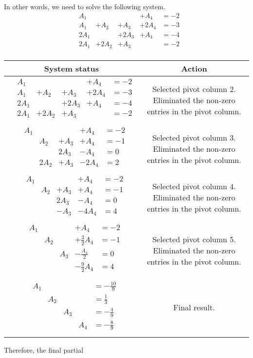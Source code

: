 {\[\]
In other words, we need to solve the following system. \[\begin{array}{llllll} & A_{1} & & & +A_{4} & =-2\\ & A_{1} & +A_{2} & +A_{3} & +2A_{4} & =-3\\ & 2A_{1} & & +2A_{3} & +A_{4} & =-4\\ & 2A_{1} & +2A_{2} & +A_{3} & & =-2\\\end{array}\] \begin{longtable}{cc} System status&Action \\\hline $\begin{array}{llllll} & A_{1} & & & +A_{4} & =-2\\ & A_{1} & +A_{2} & +A_{3} & +2A_{4} & =-3\\ & 2A_{1} & & +2A_{3} & +A_{4} & =-4\\ & 2A_{1} & +2A_{2} & +A_{3} & & =-2\\\end{array}$& Selected pivot column 2. Eliminated the non-zero entries in the pivot column. \\\hline $\begin{array}{llllll} & A_{1} & & & +A_{4} & =-2\\ & & A_{2} & +A_{3} & +A_{4} & =-1\\ & & & 2A_{3} & -A_{4} & =0\\ & & 2A_{2} & +A_{3} & -2A_{4} & =2\\\end{array}$& Selected pivot column 3. Eliminated the non-zero entries in the pivot column. \\\hline $\begin{array}{llllll} & A_{1} & & & +A_{4} & =-2\\ & & A_{2} & +A_{3} & +A_{4} & =-1\\ & & & 2A_{3} & -A_{4} & =0\\ & & & -A_{3} & -4A_{4} & =4\\\end{array}$& Selected pivot column 4. Eliminated the non-zero entries in the pivot column. \\\hline $\begin{array}{llllll} & A_{1} & & & +A_{4} & =-2\\ & & A_{2} & & +\frac{3}{2}A_{4} & =-1\\ & & & A_{3} & -\frac{A_{4} }{2} & =0\\ & & & & -\frac{9}{2}A_{4} & =4\\\end{array}$& Selected pivot column 5. Eliminated the non-zero entries in the pivot column. \\\hline $\begin{array}{llllll} & A_{1} & & & & =-\frac{10}{9}\\ & & A_{2} & & & =\frac{1}{3}\\ & & & A_{3} & & =-\frac{4}{9}\\ & & & & A_{4} & =-\frac{8}{9}\\\end{array}$& Final result.\\ \end{longtable}Therefore, the final partial }
